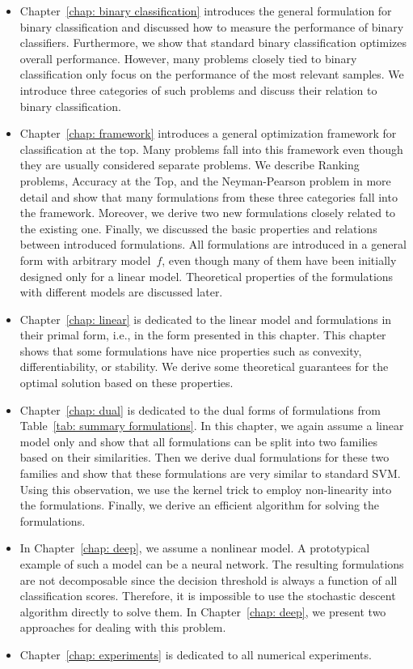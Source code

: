 \begin{itemize}
  \item Chapter~\ref{chap: binary classification} introduces the general formulation for binary classification and discussed how to measure the performance of binary classifiers. Furthermore, we show that standard binary classification optimizes overall performance. However, many problems closely tied to binary classification only focus on the performance of the most relevant samples. We introduce three categories of such problems and discuss their relation to binary classification.
  \item Chapter~\ref{chap: framework} introduces a general optimization framework for classification at the top. Many problems fall into this framework even though they are usually considered separate problems. We describe Ranking problems, Accuracy at the Top, and the Neyman-Pearson problem in more detail and show that many formulations from these three categories fall into the framework. Moreover, we derive two new formulations closely related to the existing one. Finally, we discussed the basic properties and relations between introduced formulations. All formulations are introduced in a general form with arbitrary model~$f$, even though many of them have been initially designed only for a linear model. Theoretical properties of the formulations with different models are discussed later.
  \item Chapter~\ref{chap: linear} is dedicated to the linear model and formulations in their primal form, i.e., in the form presented in this chapter. This chapter shows that some formulations have nice properties such as convexity, differentiability, or stability. We derive some theoretical guarantees for the optimal solution based on these properties.
  \item Chapter~\ref{chap: dual} is dedicated to the dual forms of formulations from Table~\ref{tab: summary formulations}. In this chapter, we again assume a linear model only and show that all formulations can be split into two families based on their similarities. Then we derive dual formulations for these two families and show that these formulations are very similar to standard SVM. Using this observation, we use the kernel trick to employ non-linearity into the formulations. Finally, we derive an efficient algorithm for solving the formulations.
  \item In Chapter~\ref{chap: deep}, we assume a nonlinear model. A prototypical example of such a model can be a neural network. The resulting formulations are not decomposable since the decision threshold is always a function of all classification scores. Therefore, it is impossible to use the stochastic descent algorithm directly to solve them. In Chapter~\ref{chap: deep}, we present two approaches for dealing with this problem.
  \item Chapter~\ref{chap: experiments} is dedicated to all numerical experiments.
\end{itemize}
